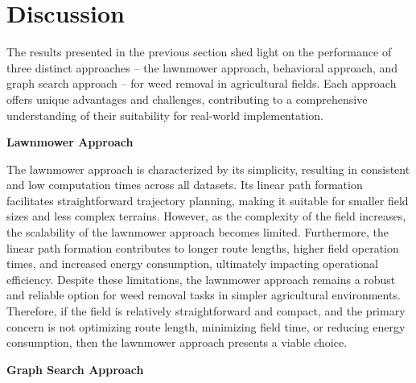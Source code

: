 
\chapter{Discussion}

The results presented in the previous section shed light on the performance of three distinct approaches – the lawnmower approach, behavioral approach, and graph search approach – for weed removal in agricultural fields. Each approach offers unique advantages and challenges, contributing to a comprehensive understanding of their suitability for real-world implementation.

\vspace{3mm} 

\textbf{Lawnmower Approach}


The lawnmower approach is characterized by its simplicity, resulting in consistent and low computation times across all datasets. Its linear path formation facilitates straightforward trajectory planning, making it suitable for smaller field sizes and less complex terrains. However, as the complexity of the field increases, the scalability of the lawnmower approach becomes limited. Furthermore, the linear path formation contributes to longer route lengths, higher field operation times, and increased energy consumption, ultimately impacting operational efficiency. Despite these limitations, the lawnmower approach remains a robust and reliable option for weed removal tasks in simpler agricultural environments. Therefore, if the field is relatively straightforward and compact, and the primary concern is not optimizing route length, minimizing field time, or reducing energy consumption, then the lawnmower approach presents a viable choice.

\vspace{3mm} 

\textbf{Graph Search Approach}


